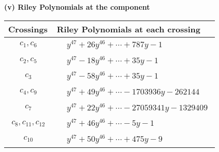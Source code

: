 \documentclass[1p]{elsarticle_modified}
\theoremstyle{definition}
\begin{document}
\flushleft \textbf{(v) Riley Polynomials at the component}\newline \\
\begin{tabular}{m{50pt}|m{274pt}}
Crossings & \hspace{64pt}Riley Polynomials at each crossing \\
\hline $$\begin{aligned}c_{1},c_{6}\end{aligned}$$&$\begin{aligned}
&y^{47}+26 y^{46}+\cdots+787 y-1
\end{aligned}$\\
\hline $$\begin{aligned}c_{2},c_{5}\end{aligned}$$&$\begin{aligned}
&y^{47}-18 y^{46}+\cdots+35 y-1
\end{aligned}$\\
\hline $$\begin{aligned}c_{3}\end{aligned}$$&$\begin{aligned}
&y^{47}-58 y^{46}+\cdots+35 y-1
\end{aligned}$\\
\hline $$\begin{aligned}c_{4},c_{9}\end{aligned}$$&$\begin{aligned}
&y^{47}+49 y^{46}+\cdots-1703936 y-262144
\end{aligned}$\\
\hline $$\begin{aligned}c_{7}\end{aligned}$$&$\begin{aligned}
&y^{47}+22 y^{46}+\cdots-27059341 y-1329409
\end{aligned}$\\
\hline $$\begin{aligned}c_{8},c_{11},c_{12}\end{aligned}$$&$\begin{aligned}
&y^{47}+46 y^{46}+\cdots-5 y-1
\end{aligned}$\\
\hline $$\begin{aligned}c_{10}\end{aligned}$$&$\begin{aligned}
&y^{47}+50 y^{46}+\cdots+475 y-9
\end{aligned}$\\
\hline
\end{tabular}\\~\\
\end{document}

